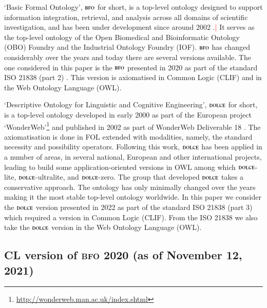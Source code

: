 \documentclass[ao]{iosart2x}
\newcommand{\nb}[1]{\textcolor{red}{$|$}\marginpar{\hspace*{-0cm}\parbox{20mm}{\scriptsize\raggedright\textcolor{red}{#1}}}}
\newcommand{\dolce}{{\textsc{dolce}}}
\newcommand{\bfo}{{\textsc{bfo}}}
\begin{document}
`Basic Formal Ontology', $\bfo$ for short, is a top-level ontology designed to support information integration, retrieval, and analysis across all domains of scientific investigation, and has been under development since around 2002  \citep{grenonBiodynamic2004}.\nb{per bib vedi file .tex}
It serves as the top-level ontology of the Open Biomedical and Bioinformatic Ontology (OBO) Foundry and the Industrial Ontology Foundry (IOF). $\bfo$ has changed considerably over the years and today there are several versions available.
The one considered in this paper is the $\bfo$ presented in 2020 as part of the standard ISO 21838 (part 2) \citep{ISO21838}. This version is axiomatised in Common Logic (CLIF) \citep{ISO24707} and in the Web Ontology Language (OWL).


`Descriptive Ontology for Linguistic and Cognitive Engineering', $\dolce$ for short, is a top-level ontology developed in early 2000 as part of the European project `WonderWeb'\footnote{\url{http://wonderweb.man.ac.uk/index.shtml}} and published in 2002 as part of WonderWeb Deliverable 18 \citep{D18}. The axiomatisation is done in FOL extended with modalities, namely, the standard necessity and possibility operators. Following this work, $\dolce$ has been applied in a number of areas, in several national, European and other international projects, leading to build some application-oriented versions in OWL among which $\dolce$-lite, $\dolce$-ultralite, and $\dolce$-zero. 
The group that developed $\dolce$ takes a conservative approach. The ontology has only minimally changed over the years making it the most stable top-level ontology worldwide. In this paper we consider the $\dolce$ version presented in 2022 as part of the standard ISO 21838 (part 3) which required a version in Common Logic (CLIF). 
From the ISO 21838 we also take the $\dolce$ version in the Web Ontology Language (OWL).

\subsection{CL version of {\bfo} 2020 (as of November 12, 2021)}\label{sect_bfo}

%
\end{document}
